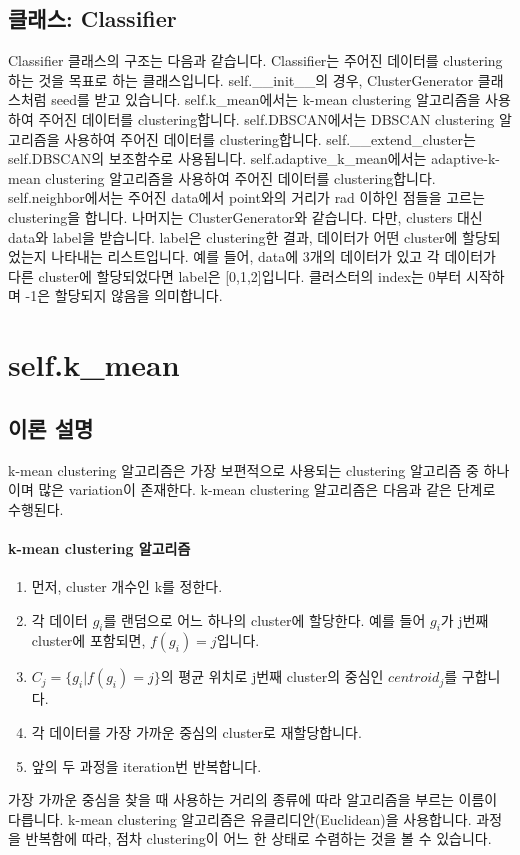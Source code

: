 \documentclass{oblivoir}
\begin{document}
  \subsection{클래스: Classifier}
  Classifier 클래스의 구조는 다음과 같습니다.
  Classifier는 주어진 데이터를 clustering하는 것을 목표로 하는 클래스입니다.
  self.\_\_init\_\_의 경우, ClusterGenerator 클래스처럼 seed를 받고 있습니다.
  self.k\_mean에서는 k-mean clustering 알고리즘을 사용하여 주어진 데이터를 clustering합니다.
  self.DBSCAN에서는 DBSCAN clustering 알고리즘을 사용하여 주어진 데이터를 clustering합니다.
  self.\_\_extend\_cluster는 self.DBSCAN의 보조함수로 사용됩니다.
  self.adaptive\_k\_mean에서는 adaptive-k-mean clustering 알고리즘을 사용하여 주어진 데이터를 clustering합니다.
  self.neighbor에서는 주어진 data에서 point와의 거리가 rad 이하인 점들을 고르는 clustering을 합니다.
  나머지는 ClusterGenerator와 같습니다. 다만, clusters 대신 data와 label을 받습니다.
  label은 clustering한 결과, 데이터가 어떤 cluster에 할당되었는지 나타내는 리스트입니다.
  예를 들어, data에 3개의 데이터가 있고 각 데이터가 다른 cluster에 할당되었다면 label은 [0,1,2]입니다.
  클러스터의 index는 0부터 시작하며 -1은 할당되지 않음을 의미합니다.

  \section{self.k\_mean}
  \subsection{이론 설명}
  k-mean clustering 알고리즘은 가장 보편적으로 사용되는 clustering 알고리즘 중 하나이며 많은 variation이 존재한다.
  k-mean clustering 알고리즘은 다음과 같은 단계로 수행된다.
  \paragraph{k-mean clustering 알고리즘}
  \begin{enumerate}
    \item 먼저, cluster 개수인 k를 정한다.
    \item 각 데이터 $g_i$를 랜덤으로 어느 하나의 cluster에 할당한다. 예를 들어 $g_i$가 j번째 cluster에 포함되면, $f(g_i)=j$입니다.
    \item $C_j=\{g_i|f(g_i)=j\}$의 평균 위치로 j번째 cluster의 중심인 $centroid_j$를 구합니다.
    \item 각 데이터를 가장 가까운 중심의 cluster로 재할당합니다.
    \item 앞의 두 과정을 iteration번 반복합니다.
  \end{enumerate}
  가장 가까운 중심을 찾을 때 사용하는 거리의 종류에 따라 알고리즘을 부르는 이름이 다릅니다. k-mean clustering 알고리즘은 유클리디안(Euclidean)을 사용합니다.
  과정을 반복함에 따라, 점차 clustering이 어느 한 상태로 수렴하는 것을 볼 수 있습니다.
\end{document}
